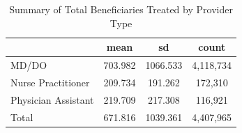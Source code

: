 \begin{table}[htbp]\centering
\def\sym#1{\ifmmode^{#1}\else\(^{#1}\)\fi}
\caption{Summary of Total Beneficiaries Treated by Provider Type}
\begin{tabular}{l*{1}{ccc}}
\toprule
                    &        mean&          sd&       count\\
\midrule
MD/DO               &     703.982&    1066.533&   4,118,734\\
Nurse Practitioner  &     209.734&     191.262&     172,310\\
Physician Assistant &     219.709&     217.308&     116,921\\
Total               &     671.816&    1039.361&   4,407,965\\
\bottomrule
\end{tabular}
\end{table}
